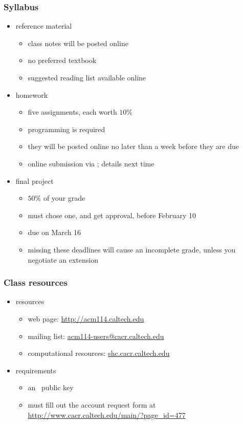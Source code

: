 \begin{frame}[fragile]
%
  \frametitle{Syllabus}
%
%
  \begin{itemize}
%
  \item reference material
    \begin{itemize}
    \item class notes will be posted online
    \item no preferred textbook
    \item suggested reading list available online
    \end{itemize}
%
  \item homework
    \begin{itemize}
    \item five assignments, each worth $10\%$ 
    \item programming is required
    \item they will be posted online no later than a week before they are due
    \item online submission via \bzr; details next time
    \end{itemize}
%
  \item final project
    \begin{itemize}
    \item $50\%$ of your grade
    \item must chose one, and get approval, before February 10
    \item due on March 16
    \item missing these deadlines will cause an incomplete grade, unless you negotiate an
      extension
    \end{itemize}
%
  \end{itemize}
%
\end{frame}

\begin{frame}[fragile]
%
  \frametitle{Class resources}
%
%
  \begin{itemize}
%
  \item resources
    \begin{itemize}
    \item web page: \url{http://acm114.caltech.edu}
    \item mailing list: \url{acm114-users@cacr.caltech.edu}
    \item computational resources: \url{shc.cacr.caltech.edu}
    \end{itemize}
%
  \item requirements
    \begin{itemize}
    \item an \ssh\ public key
    \item must fill out the account request form at
      \url{http://www.cacr.caltech.edu/main/?page_id=477}
    \end{itemize}
      
%
  \end{itemize}
%
\end{frame}


